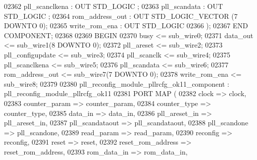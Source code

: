 \begin{DoxyCode}
{02362             pll_scanclkena  : \textcolor{keywordflow}{OUT} \textcolor{comment}{STD\_LOGIC} ;
02363             pll_scandata    : \textcolor{keywordflow}{OUT} \textcolor{comment}{STD\_LOGIC} ;
02364             rom_address_out : \textcolor{keywordflow}{OUT} \textcolor{comment}{STD\_LOGIC\_VECTOR} (\textcolor{vhdllogic}{}\textcolor{vhdllogic}{7} \textcolor{keywordflow}{DOWNTO} \textcolor{vhdllogic}{}\textcolor{vhdllogic}{0});
02365             write_rom_ena   : \textcolor{keywordflow}{OUT} \textcolor{comment}{STD\_LOGIC} 
02366     );
02367     \textcolor{keywordflow}{END} \textcolor{keywordflow}{COMPONENT};
02368 
02369 \textcolor{vhdlkeyword}{BEGIN}
02370     \textcolor{vhdlchar}{busy}    \textcolor{vhdlchar}{<=} \textcolor{vhdlchar}{sub_wire0};
02371     \textcolor{vhdlchar}{data_out}    \textcolor{vhdlchar}{<=} \textcolor{vhdlchar}{sub_wire1}\textcolor{vhdlchar}{(}\textcolor{vhdllogic}{}\textcolor{vhdllogic}{8} \textcolor{keywordflow}{DOWNTO} \textcolor{vhdllogic}{}\textcolor{vhdllogic}{0}\textcolor{vhdlchar}{)};
02372     \textcolor{vhdlchar}{pll_areset}    \textcolor{vhdlchar}{<=} \textcolor{vhdlchar}{sub_wire2};
02373     \textcolor{vhdlchar}{pll_configupdate}    \textcolor{vhdlchar}{<=} \textcolor{vhdlchar}{sub_wire3};
02374     \textcolor{vhdlchar}{pll_scanclk}    \textcolor{vhdlchar}{<=} \textcolor{vhdlchar}{sub_wire4};
02375     \textcolor{vhdlchar}{pll_scanclkena}    \textcolor{vhdlchar}{<=} \textcolor{vhdlchar}{sub_wire5};
02376     \textcolor{vhdlchar}{pll_scandata}    \textcolor{vhdlchar}{<=} \textcolor{vhdlchar}{sub_wire6};
02377     \textcolor{vhdlchar}{rom_address_out}    \textcolor{vhdlchar}{<=} \textcolor{vhdlchar}{sub_wire7}\textcolor{vhdlchar}{(}\textcolor{vhdllogic}{}\textcolor{vhdllogic}{7} \textcolor{keywordflow}{DOWNTO} \textcolor{vhdllogic}{}\textcolor{vhdllogic}{0}\textcolor{vhdlchar}{)};
02378     \textcolor{vhdlchar}{write_rom_ena}    \textcolor{vhdlchar}{<=} \textcolor{vhdlchar}{sub_wire8};
02379 
02380     pll_reconfig_module_pllrcfg_ok11_component : 
      pll_reconfig_module_pllrcfg_ok11
02381     \textcolor{keywordflow}{PORT} \textcolor{keywordflow}{MAP} (
02382         clock => clock,
02383         counter_param => counter_param,
02384         counter_type => counter_type,
02385         data_in => data_in,
02386         pll_areset_in => pll_areset_in,
02387         pll_scandataout => pll_scandataout,
02388         pll_scandone => pll_scandone,
02389         read_param => read_param,
02390         reconfig => reconfig,
02391         reset => reset,
02392         reset_rom_address => reset_rom_address,
02393         rom_data_in => rom_data_in,
}
\end{DoxyCode}
